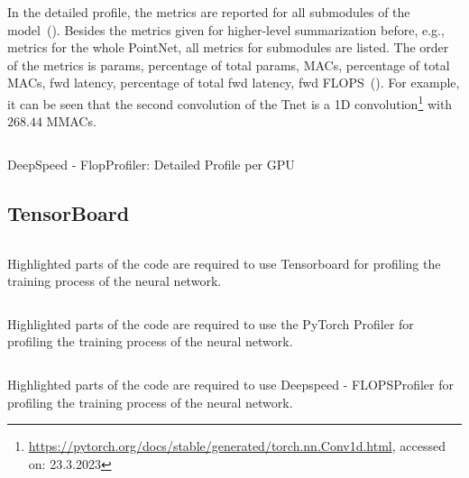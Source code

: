 \documentclass[12pt, a4paper, hidelinks]{article}
\begin{document}
In the detailed profile, the metrics are reported for all submodules of the model~(). Besides the metrics given for higher-level summarization before, e.g., metrics for the whole PointNet, all metrics for submodules are listed. The order of the metrics is params, percentage of total params, MACs, percentage of total MACs, fwd latency, percentage of total fwd latency, fwd FLOPS~(). For example, it can be seen that the second convolution of the Tnet is a 1D convolution\footnote{\url{https://pytorch.org/docs/stable/generated/torch.nn.Conv1d.html}, accessed on: 23.3.2023} with $268.44$ MMACs.

\begin{listing}[H]
\inputminted[xleftmargin=1em,linenos,fontsize=\small, firstline=41,lastline=48, breaklines]{python}{./assets/scap_gtx1080_deepspeed_14615344_4294967294_one-epoch.txt}
\caption{DeepSpeed - FlopProfiler: Detailed Profile per GPU}
\label{lst:scap_gtx1080_deepspeed_14615344_4294967294_one-epoch-detailed}
\end{listing}

\subsection{TensorBoard}
\label{sec:r-tensorboard}




\begin{listing}[H]
\inputminted[xleftmargin=1em,linenos,fontsize=\small, highlightlines={1,3,9-12,14-16}]{python}{./assets/tensorboard.py}
\caption[Code example for Tensorboard]{Highlighted parts of the code are required to use Tensorboard for profiling the training process of the neural network.}
\label{lst:tensorboard}
\end{listing}

\begin{listing}[H]
\inputminted[breaklines, xleftmargin=1em,linenos,fontsize=\small, highlightlines={4-10,14,15}]{python}{./assets/profiler-torch.py}
\caption[Code example for PyTorch - Profiler]{Highlighted parts of the code are required to use the PyTorch Profiler for profiling the training process of the neural network.}
\label{lst:profiler-torch}
\end{listing}

\begin{listing}[H]
\inputminted[xleftmargin=1em,linenos,fontsize=\small, highlightlines={1,3,4,8,9,11-18}]{python}{./assets/deepspeed.py}
\caption[Code example for Deepspeed - FLOPSProfiler]{Highlighted parts of the code are required to use Deepspeed - FLOPSProfiler for profiling the training process of the neural network.}
\label{lst:deepspeed}
\end{listing}
\end{document}
